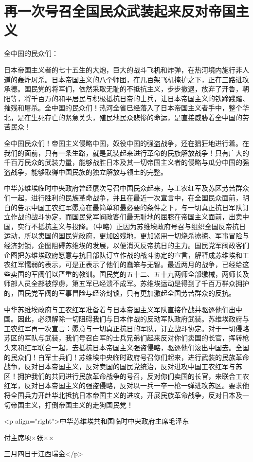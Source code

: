 \section[再一次号召全国民众武装起来反对帝国主义（一九三三年三月四日）]{再一次号召全国民众武装起来反对帝国主义}


全中国的民众们：

日本帝国主义者的七十五生的大炮，巨大的战斗飞机和炸弹，在热河境内施行非人道的轰炸屠杀。日本帝国主义的八个师团，在几百架飞机掩护之下，正在三路进攻承德。国民党的将军们，依然采取无耻的不抵抗主义，步步撤退，放弃了开鲁，朝阳等，将千百万的和平居民与积极抵抗日帝的士兵，让日本帝国主义的铁蹄践踏、摧残和屠杀。全中国的民众们！热河全省已经落入了日本帝国主义者手中，整个华北，是在生死存亡的紧急关头，殖民地民众悲惨的命运，是直接威胁着全中国的劳苦民众！

全中国民众们！帝国主义侵略中国，奴役中国的强盗战争，还在猖狂地进行着。在我们的面前，只有一条生路，就是武装起来进行革命的民族解放战争！只有广大的千百万民众的武装力量，能够战胜日本及其一切帝国主义者的侵略与瓜分中国的强盗战争，能够取得中国民族的独立解放与领土的完整。

中华苏维埃临时中央政府曾经屡次号召中国民众起来，与工农红军及苏区劳苦群众们一起，进行胜利的民族革命战争，并且在最近一次宣言中，在全国民众面前，明白的告示中国工农红军愿意在最简单和最必要的条件之下，与一切真正抗日军队订立作战的战斗协定，而国民党军阀政客们最无耻地的屈膝在帝国主义面前，出卖中国，实行不抵抗主义与投降。（中略）正因为苏维埃政府号召与组织全国反帝抗日运动，所以卖国的国民党政府，更加凶残地，更加紧用一切烧杀掳掠、军事冒险与经济封锁，企图阻碍苏维埃的发展，以便消灭反帝抗日的主力。国民党军阀政客们企图把苏维埃政府愿意与抗日部队订立作战的战斗协定的宣言，解释成苏维埃和工农红军懦弱的表示，可是正表示了他们的蠢笨与无智。最近两月的战争，已经给这些卖国的军阀们以严重的教训。国民党的五十二、五十九两师全部缴械，两师长及师部人员全部被俘虏，第五军已经溃不成军。苏维埃运动是得到了千百万群众拥护的，国民党军阀的军事冒险与经济封锁，只有更加激起全国劳苦群众的反抗。

中华苏维埃政府与工农红军准备着与日本帝国主义军队直接作战并驱逐他们出中国。因此，必须解除一切阻碍我们与日本作战的反动军队政府武装。苏维埃政府与工农红军再一次宣言：愿意与一切真正抗日的军队，订立战斗协定。对于一切侵略苏区的军队与武装，我们号召白军的士兵兄弟们起来反对你们卖国的长官，挥转枪头来和红军联合一起，去抵抗日本帝国主义强盗侵略，驱逐他们滚出中国去。全国的民众们！白军士兵们！苏维埃中央临时政府号召你们起来，进行武装的民族革命战争，反对日本帝国主义，反对卖国的国民党统治，反对进攻中国工农红军与苏区！拥护我们的共同进行民族革命战争的号召，反对你们卖国的长官，来联合工农红军，反对日本帝国主义的强盗侵略，反对以一兵一卒一枪一弹进攻苏区。要求他将全国兵力开赴华北抵抗日本帝国主义的进攻，开展民族革命战争，反对日本及一切帝国主义，打倒帝国主义的走狗国民党！

<p align="right">中华苏维埃共和国临时中央政府主席毛泽东

付主席项×张××

三月四日于江西瑞金</p>

